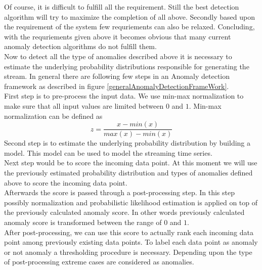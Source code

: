 \documentclass[12pt]{article}
\begin{document}
Of course, it is difficult to fulfill all the requirement. Still the best detection algorithm will try to maximize the completion of all above. Secondly based upon the requirement of the system few requriements can also be relaxed.
Concluding, with the requriements given above it becomes obvious that many current anomaly detection algorithms do not fulfill them.\\
\break
Now to detect all the type of anomalies described above it is necessary to estimate the underlying probability distributions responsible for generating the stream. In general there are following few steps in an Anomaly detection framework as described in figure \ref{generalAnomalyDetectionFrameWork}.\\
\break
First step is to pre-process the input data. We use min-max normalization to make sure that all input values are limited between $0$ and $1$. Min-max normalization can be defined as
\begin{equation}
    z = \frac{x - min(x)}{max(x) - min(x)}
    \label{minMaxNormalization}
\end{equation}
Second step is to estimate the underlying probability distribution by building a model. This model can be used to model the streaming time series. \\
\break
Next step would be to score the incoming data point. At this moment we will use the previously estimated probability distribution and types of anomalies defined above to score the incoming data point. \\
\break
Afterwards the score is passed through a post-processing step. In this step possibly normalization and probabilistic likelihood estimation is applied on top of the previously calculated anomaly score. In other words previously calculated anomaly score is transformed between the range of $0$ and $1$. \\
\break
After post-processing, we can use this score to actually rank each incoming data point among previously existing data points. To label each data point as anomaly or not anomaly a thresholding procedure is necessary. Depending upon the type of post-processing extreme cases are considered as anomalies.
\end{document}
